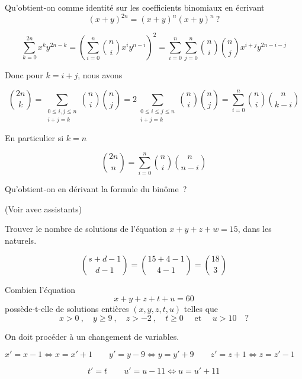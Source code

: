 \begin{exo}
Qu'obtient-on comme identit\'e sur les coefficients binomiaux en \'ecrivant
\[
(x+y)^{2n} = (x+y)^n(x+y)^n\ ?
\]
\end{exo}

\[ 
\sum_{k=0}^{2n} x^k y^{2n-k} = \left( \sum_{i=0}^{n} {n \choose i} x^i y^{n-i} \right)^2 = \sum_{i=0}^{n} \sum_{j=0}^{n} {n \choose i} {n \choose j} x^{i+j} y^{2n-i-j}
\]

Donc pour $k = i+j$, nous avons

\[
{2n \choose k} = \sum_{ \substack{0 \leq i, j \leq n \\ i+j = k} } {n \choose i} {n \choose j} = 2 \sum_{ \substack{0 \leq i \leq j \leq n \\ i+j = k} } {n \choose i} {n \choose j} = \sum_{i=0}^{n} {n \choose i} {n \choose k-i}
\]

En particulier si $k=n$

\[
{2n \choose n} = \sum_{i=0}^{n} {n \choose i } {n \choose n-i}
\]

\newpage

\begin{exo}
Qu'obtient-on en d\'erivant la formule du bin\^ome~?
\end{exo}

(Voir avec assistants)


\begin{exo}
Trouver le nombre de solutions de l'\'equation $x + y + z + w = 15$, dans les naturels.
\end{exo}

\[ { s + d - 1 \choose d - 1 } = { 15 + 4 - 1 \choose 4 - 1} = {18 \choose 3 } \]


\begin{exo} 
Combien l'\'equation
\[
x + y + z + t + u = 60
\]
poss\`ede-t-elle de solutions enti\`eres $(x,y,z,t,u)$ telles que
\[
x > 0\ ,\quad y \geqslant 9\ , \quad z > -2\ , \quad t \geqslant 0 \quad \textrm{ et }  \quad u > 10 \quad ?
\]
\end{exo}

On doit procéder à un changement de variables.

${x}' = x-1 \Leftrightarrow x= {x}'+1 \qquad {y}' = y-9 \Leftrightarrow y= {y}'+9 \qquad {z}' = z+1 \Leftrightarrow z= {z}'-1 $

$\qquad \qquad \qquad \qquad \qquad {t}' = t \qquad {u}' = u-11 \Leftrightarrow u= {u}'+11$

